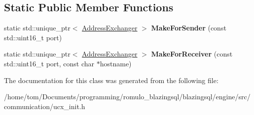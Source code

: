 \subsection*{Static Public Member Functions}
\begin{DoxyCompactItemize}
\item 
\mbox{\label{classral_1_1communication_1_1AddressExchanger_ab976b52f00f63554e798d3372bdb8caf}} 
static std\+::unique\+\_\+ptr$<$ \hyperlink{classral_1_1communication_1_1AddressExchanger}{Address\+Exchanger} $>$ {\bfseries Make\+For\+Sender} (const std\+::uint16\+\_\+t port)
\item 
\mbox{\label{classral_1_1communication_1_1AddressExchanger_abbb8262eced0853ab6293def89f6ef87}} 
static std\+::unique\+\_\+ptr$<$ \hyperlink{classral_1_1communication_1_1AddressExchanger}{Address\+Exchanger} $>$ {\bfseries Make\+For\+Receiver} (const std\+::uint16\+\_\+t port, const char $\ast$hostname)
\end{DoxyCompactItemize}


The documentation for this class was generated from the following file\+:\begin{DoxyCompactItemize}
\item 
/home/tom/\+Documents/programming/romulo\+\_\+blazingsql/blazingsql/engine/src/communication/ucx\+\_\+init.\+h\end{DoxyCompactItemize}
